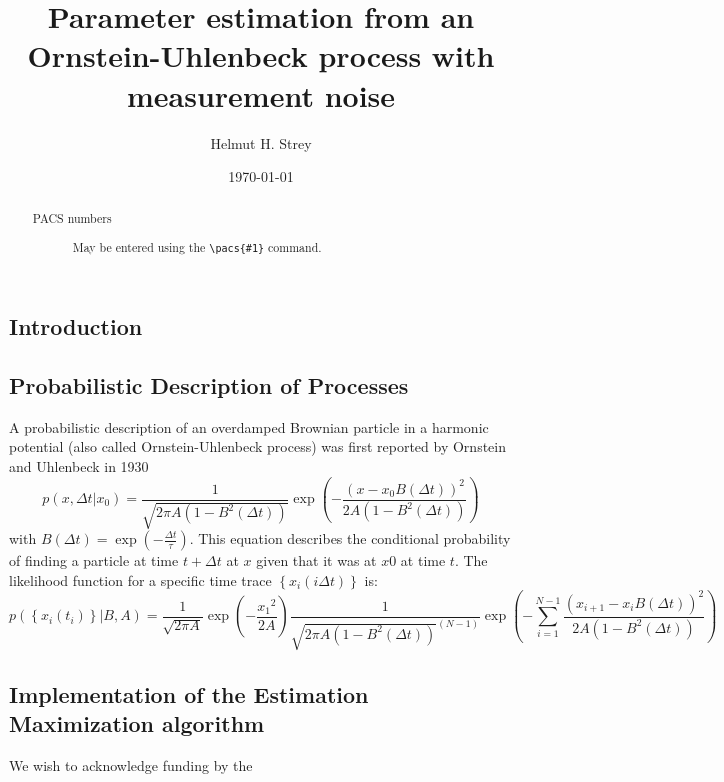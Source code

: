 \documentclass[%
 reprint,
 amsmath,amssymb,
 aps,
]{revtex4-1}
\begin{document}

\title{Parameter estimation from an Ornstein-Uhlenbeck process with measurement noise}

\author{Helmut H. Strey}

\date{\today}%

\begin{abstract}
\begin{description}
\item[PACS numbers]
May be entered using the \verb+\pacs{#1}+ command.
\end{description}
\end{abstract}

\maketitle

\onecolumngrid
\subsection{Introduction}
\subsection{Probabilistic Description of Processes}
A probabilistic description of an overdamped Brownian particle in a harmonic potential (also called Ornstein-Uhlenbeck process) was first reported by Ornstein and Uhlenbeck in 1930 \cite{RN28}
\begin{equation}\label{OUp}
p\left( {x,\Delta t\left| {x_0} \right.} \right) = \frac{1}{{\sqrt {2\pi A(1-B^{2}(\Delta t))} }}\exp \left( { - \frac{{{{\left( {x - {x_0}B(\Delta t)} \right)}^2}}}{{2A(1-B^{2}(\Delta t))}}} \right)
\end{equation}
with $B(\Delta t) = \exp \left( { - \frac{\Delta t}{\tau}} \right)$.
This equation describes the conditional probability of finding a particle at time $t+\Delta t$ at $x$ given that it was at $x0$ at time $t$.  The likelihood function for a specific time trace $\left\{x_i(i\Delta t)\right\}$ is:
\begin{equation}
	p\left( \left\{x_i(t_i)\right\} \left| B, A \right.\right) =
	\frac{1}{\sqrt {2 \pi A} }
	\exp \left( { - \frac{{x_1}^2}{2A}}\right)
	\frac{1}{{\sqrt {2\pi A(1-B^{2}(\Delta t))}^{(N-1)} }}
	\exp \left( { - \sum\limits_{i=1}^{N-1}\frac{{{{\left( {x_{i+1} - {x_i}B(\Delta t)} \right)}^2}}}{{2A(1-B^{2}(\Delta t))}}} \right)
\end{equation}
\subsection{Implementation of the Estimation Maximization algorithm}
\begin{acknowledgments}
We wish to acknowledge funding by the 
\end{acknowledgments}
\end{document}
